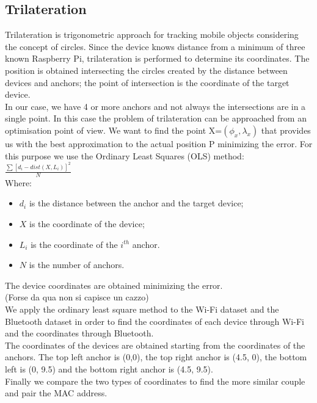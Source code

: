 \subsection{Trilateration}
Trilateration is trigonometric approach for tracking mobile objects considering the concept of circles. Since the device knows distance from a minimum of three known Raspberry Pi, trilateration is performed to determine its coordinates. The position is obtained intersecting the circles created by the distance between devices and anchors; the point of intersection is the coordinate of the target device.\\
\linebreak
In our case, we have 4 or more anchors and not always the intersections are in a single point. In this case the problem of trilateration can be approached from an optimisation point of view. We want to find the point X=\(\left(\phi_x, \lambda_x\right)\) that provides us with the best approximation to the actual position P minimizing the error. For this purpose we use the Ordinary Least Squares (OLS) method: \(\frac{\sum { \left[d_i  -dist\left(X,L_i\right)\right] }^2 }{N}\)\\
Where:
\begin{itemize}
\item \(d_i\) is the distance between the anchor and the target device;
\item \(X\) is the coordinate of the device;
\item \(L_i\) is the coordinate of the \(i^{th}\) anchor.
\item \(N\) is the number of anchors.
\end{itemize}
The device coordinates are obtained minimizing the error.\\
\linebreak
(Forse da qua non si capisce un cazzo)\\
We apply the ordinary least square method to the Wi-Fi dataset and the Bluetooth dataset in order to find the coordinates of each device through Wi-Fi and the coordinates through Bluetooth.\\
The coordinates of the devices are obtained starting from the coordinates of the anchors. The top left anchor is (0,0), the top right anchor is (4.5, 0), the bottom left is (0, 9.5) and the bottom right anchor is (4.5, 9.5).\\
Finally we compare the two types of coordinates to find the more similar couple and pair the MAC address.

